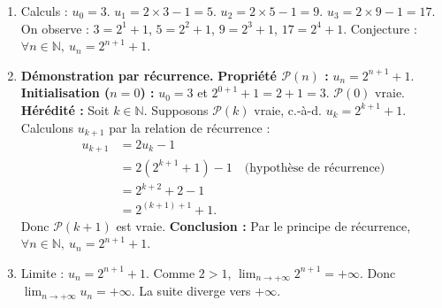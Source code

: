 \documentclass[11pt]{article}
\begin{document}
\begin{corrige}
\begin{enumerate}
    \item Calculs :
    $u_0 = 3$.
    $u_1 = 2\times 3 - 1 = 5$.
    $u_2 = 2\times 5 - 1 = 9$.
    $u_3 = 2\times 9 - 1 = 17$.
    On observe : $3 = 2^1+1$, $5 = 2^2+1$, $9 = 2^3+1$, $17 = 2^4+1$.
    Conjecture : $\forall n \in \mathbb{N},\ u_n = 2^{n+1} + 1$.
    \item \textbf{Démonstration par récurrence.}
    \textbf{Propriété $\mathcal{P}(n)$ :} $u_n = 2^{n+1} + 1$.
    \textbf{Initialisation ($n=0$) :} $u_0 = 3$ et $2^{0+1}+1 = 2+1=3$. $\mathcal{P}(0)$ vraie.
    \textbf{Hérédité :} Soit $k \in \mathbb{N}$. Supposons $\mathcal{P}(k)$ vraie, c.-à-d. $u_k = 2^{k+1} + 1$.
    Calculons $u_{k+1}$ par la relation de récurrence :
    \begin{align*}
    u_{k+1} &= 2u_k - 1 \\
    &= 2(2^{k+1} + 1) - 1 \quad \text{(hypothèse de récurrence)} \\
    &= 2^{k+2} + 2 - 1 \\
    &= 2^{(k+1)+1} + 1.
    \end{align*}
    Donc $\mathcal{P}(k+1)$ est vraie.
    \textbf{Conclusion :} Par le principe de récurrence, $\forall n \in \mathbb{N},\ u_n = 2^{n+1} + 1$.
    \item Limite : $u_n = 2^{n+1} + 1$. Comme $2 > 1$, $\lim_{n\to+\infty} 2^{n+1} = +\infty$. Donc $\lim_{n\to+\infty} u_n = +\infty$. La suite diverge vers $+\infty$.
\end{enumerate}
\end{corrige}
\end{document}

